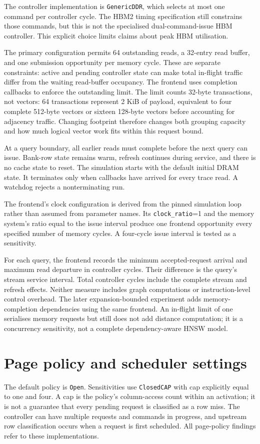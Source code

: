 \documentclass[11pt,a4paper]{report}
\begin{document}
The controller implementation is \texttt{GenericDDR}, which selects at most one command per controller cycle. The HBM2 timing specification still constrains those commands, but this is not the specialised dual-command-issue HBM controller. This explicit choice limits claims about peak HBM utilisation.

The primary configuration permits 64 outstanding reads, a 32-entry read buffer, and one submission opportunity per memory cycle. These are separate constraints: active and pending controller state can make total in-flight traffic differ from the waiting read-buffer occupancy. The frontend uses completion callbacks to enforce the outstanding limit. The limit counts 32-byte transactions, not vectors: 64 transactions represent 2 KiB of payload, equivalent to four complete 512-byte vectors or sixteen 128-byte vectors before accounting for adjacency traffic. Changing footprint therefore changes both grouping capacity and how much logical vector work fits within this request bound.

At a query boundary, all earlier reads must complete before the next query can issue. Bank-row state remains warm, refresh continues during service, and there is no cache state to reset. The simulation starts with the default initial DRAM state. It terminates only when callbacks have arrived for every trace read. A watchdog rejects a nonterminating run.

The frontend's clock configuration is derived from the pinned simulation loop rather than assumed from parameter names. Its \texttt{clock\_ratio}=1 and the memory system's ratio equal to the issue interval produce one frontend opportunity every specified number of memory cycles. A four-cycle issue interval is tested as a sensitivity.

For each query, the frontend records the minimum accepted-request arrival and maximum read departure in controller cycles. Their difference is the query's stream service interval. Total controller cycles include the complete stream and refresh effects. Neither measure includes graph computations or instruction-level control overhead. The later expansion-bounded experiment adds memory-completion dependencies using the same frontend. An in-flight limit of one serialises memory requests but still does not add distance computation; it is a concurrency sensitivity, not a complete dependency-aware HNSW model.

\section{Page policy and scheduler settings}
The default policy is \texttt{Open}. Sensitivities use \texttt{ClosedCAP} with cap explicitly equal to one and four. A cap is the policy's column-access count within an activation; it is not a guarantee that every pending request is classified as a row miss. The controller can have multiple requests and commands in progress, and upstream row classification occurs when a request is first scheduled. All page-policy findings refer to these implementations.
\end{document}
